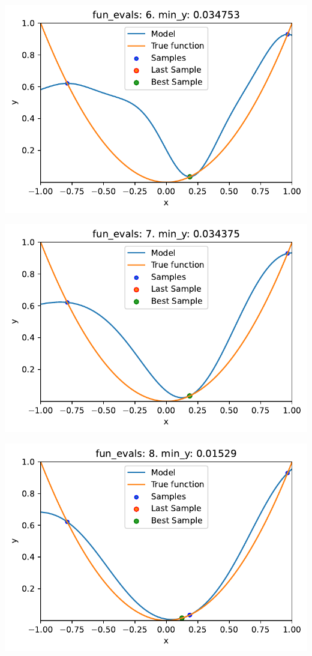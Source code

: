 \documentclass[
  letterpaper,
  DIV=11,
  numbers=noendperiod]{scrreprt}
\begin{document}
\includegraphics{010_num_spot_sklearn_surrogate_files/figure-pdf/cell-39-output-5.pdf}

\includegraphics{010_num_spot_sklearn_surrogate_files/figure-pdf/cell-39-output-6.pdf}

\includegraphics{010_num_spot_sklearn_surrogate_files/figure-pdf/cell-39-output-7.pdf}
\end{document}
